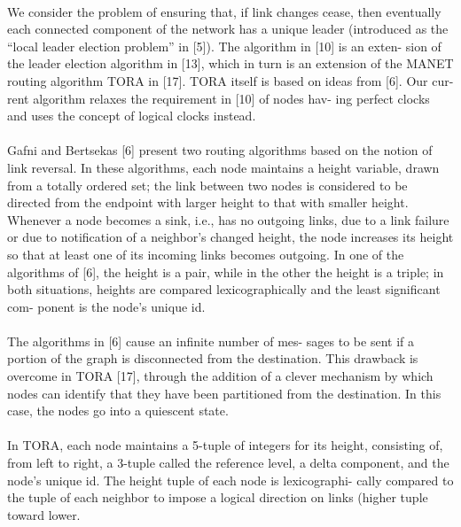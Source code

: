 \documentclass{article}
\begin{document}
\paragraph{}We consider the problem of ensuring that, if link changes
cease, then eventually each connected component of the
network has a unique leader (introduced as the “local leader
election problem” in [5]). The algorithm in [10] is an exten-
sion of the leader election algorithm in [13], which in turn
is an extension of the MANET routing algorithm TORA in
[17]. TORA itself is based on ideas from [6]. Our cur-
rent algorithm relaxes the requirement in [10] of nodes hav-
ing perfect clocks and uses the concept of logical clocks
instead.

\paragraph{}Gafni and Bertsekas [6] present two routing algorithms
based on the notion of link reversal. In these algorithms,
each node maintains a height variable, drawn from a totally
ordered set; the link between two nodes is considered to be
directed from the endpoint with larger height to that with
smaller height. Whenever a node becomes a sink, i.e., has
no outgoing links, due to a link failure or due to notification
of a neighbor’s changed height, the node increases its height
so that at least one of its incoming links becomes outgoing.
In one of the algorithms of [6], the height is a pair, while in
the other the height is a triple; in both situations, heights are
compared lexicographically and the least significant com-
ponent is the node’s unique id.

\paragraph{}The algorithms in [6] cause an infinite number of mes-
sages to be sent if a portion of the graph is disconnected
from the destination. This drawback is overcome in TORA
[17], through the addition of a clever mechanism by which
nodes can identify that they have been partitioned from the
destination. In this case, the nodes go into a quiescent state.

\paragraph{}In TORA, each node maintains a 5-tuple of integers
for its height, consisting of, from left to right, a 3-tuple
called the reference level, a delta component, and the node’s
unique id. The height tuple of each node is lexicographi-
cally compared to the tuple of each neighbor to impose a
logical direction on links (higher tuple toward lower.
\end{document}
